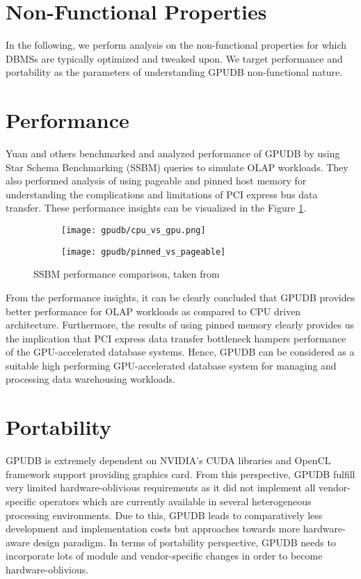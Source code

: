 \section*{Non-Functional Properties}
In the following, we perform analysis on the non-functional properties for which DBMSs are typically optimized and tweaked upon. We target performance and portability as the parameters of understanding GPUDB non-functional nature.

\section*{Performance}
Yuan and others benchmarked and analyzed performance of GPUDB by using Star Schema Benchmarking (SSBM) queries to simulate OLAP workloads. They also performed analysis of using pageable and pinned host memory for understanding the complications and limitations of PCI express bus data transfer. These performance insights can be visualized in the Figure \ref{fig:ssbm_gpudb}.

\begin{figure}[htb]
    \centering %
\begin{subfigure}{0.5\textwidth}
  \texttt{[image: gpudb/cpu\_vs\_gpu.png]}
\end{subfigure}\hfil %
\begin{subfigure}{0.5\textwidth}
  \texttt{[image: gpudb/pinned\_vs\_pageable]}
\end{subfigure}\hfil %
\caption{SSBM performance comparison, taken from \cite{gpudb_design_impl}}
\label{fig:ssbm_gpudb}
\end{figure}

From the performance insights, it can be clearly concluded that GPUDB provides better performance for OLAP workloads as compared to CPU driven architecture. Furthermore, the results of using pinned memory clearly provides us the implication that PCI express data transfer bottleneck hampers performance of the GPU-accelerated database systems. Hence, GPUDB can be considered as a suitable high performing GPU-accelerated database system for managing and processing data warehousing workloads.

\section*{Portability}
GPUDB is extremely dependent on NVIDIA's CUDA libraries and OpenCL framework support providing graphics card. From this perspective, GPUDB fulfill very limited hardware-oblivious requirements as it did not implement all vendor-specific operators which are currently available in several heterogeneous processing environments. Due to this, GPUDB leads to comparatively less development and implementation costs but approaches towards more hardware-aware design paradigm. In terms of portability perspective, GPUDB needs to incorporate lots of module and vendor-specific changes in order to become hardware-oblivious.